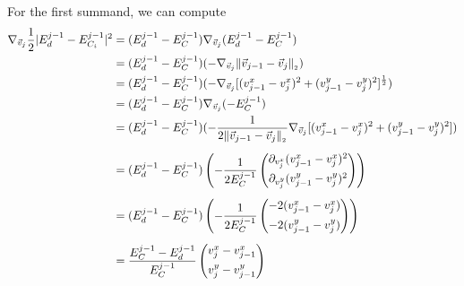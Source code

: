 \begin{proposition}
	For the first summand, we can compute 
	\begin{align*}
		\nabla_{\vec{v}_{j}} \frac{1}{2} | E^{j-1}_d - E^{j-1}_{C_i}|^2 &= (E^{j-1}_d - E^{j-1}_C) \nabla_{\vec{v}_j} (E^{j-1}_d - E^{j-1}_C) \\
		&= (E^{j-1}_d - E^{j-1}_C) (- \nabla_{\vec{v}_{j}} \norm[\vec{v}_{j-1} - \vec{v}_{j}] ) \\
		&= (E^{j-1}_d - E^{j-1}_C) (- \nabla_{\vec{v}_j} [(v_{j-1}^{x} - v_{j}^{x})^2 + (v_{j-1}^{y} - v_{j}^{y})^2]^{\frac{1}{2}} ) \\
		&= (E^{j-1}_d - E^{j-1}_C) \nabla_{\vec{v}_j} ( - E^{j-1}_C) \\
		&= (E^{j-1}_d - E^{j-1}_C) (- \frac{1}{2 \norm[\vec{v}_{j-1} - \vec{v}_{j}]} \nabla_{\vec{v}_j} [(v_{j-1}^{x} - v_{j}^{x})^2 + (v_{j-1}^{y} - v_{j}^{y})^2]) \\[0.5em] 
		&= (E^{j-1}_d - E^{j-1}_C) \left(- \frac{1}{2 E^{j-1}_C} \begin{pmatrix}
			\partial_{v_{j}^{x}} (v_{j-1}^{x} - v_{j}^{x})^2 \\[0.5em]
			\partial_{v_{j}^{y}} (v_{j-1}^{y} - v_{j}^{y})^2
		\end{pmatrix}\right) \\[0.5em]
		&= (E^{j-1}_d - E^{j-1}_C)  \left( - \frac{1}{2 E^{j-1}_C} \begin{pmatrix}
			 -2(v_{j-1}^{x} - v_{j}^{x}) \\[0.5em]
			 -2(v_{j-1}^{y} - v_{j}^{y})
		\end{pmatrix}\right) \\[0.5em] 
		&= \frac{E^{j-1}_C - E^{j-1}_d}{E^{j-1}_C} \begin{pmatrix}
			v_{j}^{x} - v_{j-1}^{x} \\[0.5em]
			v_{j}^{y} - v_{j-1}^{y}
	   \end{pmatrix} 
	\end{align*}


\end{proposition}
